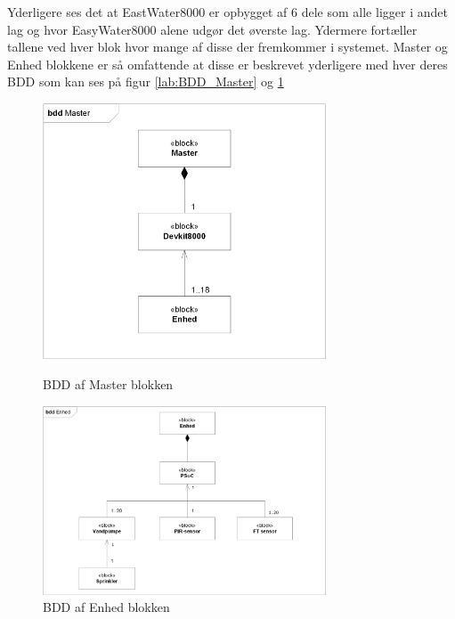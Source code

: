 Yderligere ses det at EastWater8000 er opbygget af 6 dele som alle ligger i andet lag og hvor EasyWater8000 alene udgør det øverste lag. Ydermere fortæller tallene ved hver blok hvor mange af disse der fremkommer i systemet. 
Master og Enhed blokkene er så omfattende at disse er beskrevet yderligere med hver deres BDD som kan ses på figur \ref{lab:BDD_Master} og \ref{lab:BDD_Enhed} 

\begin{figure}[H]
\begin{minipage}{0.45\textwidth}
  \centering
    \includegraphics[width=0.75\textwidth]{Billeder/BDD_Master}
    \caption{BDD af Master blokken}
    \label{lab:BDD_Master}
\end{minipage}
\hspace{0.1\textwidth}
\begin{minipage}{0.45\textwidth}
  \centering
    \includegraphics[width=0.75\textwidth]{Billeder/BDD_Enhed}
    \caption{BDD af Enhed blokken}
    \label{lab:BDD_Enhed}
    \end{minipage}
\end{figure}

